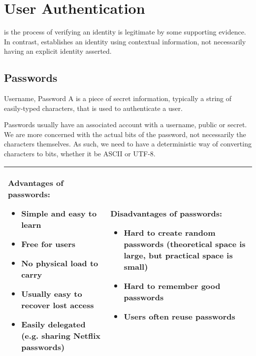 \chapter{User Authentication}

 is the process of verifying an identity is legitimate by some supporting evidence. In contrast,  establishes an identity using contextual information, not necessarily having an explicit identity asserted.

\section{Passwords}

\begin{dfnbox}{Username, Password}{}
    A  is a piece of secret information, typically a string of easily-typed characters, that is used to authenticate a user.
\end{dfnbox}


Passwords usually have an associated account with a username, public or secret. We are more concerned with the actual bits of the password, not necessarily the characters themselves. As such, we need to have a deterministic way of converting characters to bits, whether it be ASCII or UTF-8.

\begin{tabularx}{\linewidth}{| X | X |}
    \hline
    Advantages of passwords:
    \begin{itemize}[noitemsep,leftmargin=*]
        \item Simple and easy to learn
        \item Free for users
        \item No physical load to carry
        \item Usually easy to recover lost access
        \item Easily delegated (e.g. sharing Netflix passwords)
    \end{itemize}
    &
    Disadvantages of passwords:
    \begin{itemize}[noitemsep,leftmargin=*]
        \item Hard to create random passwords (theoretical space is large, but practical space is small)
        \item Hard to remember good passwords
        \item Users often reuse passwords
    \end{itemize}
    \\ \hline
\end{tabularx}

